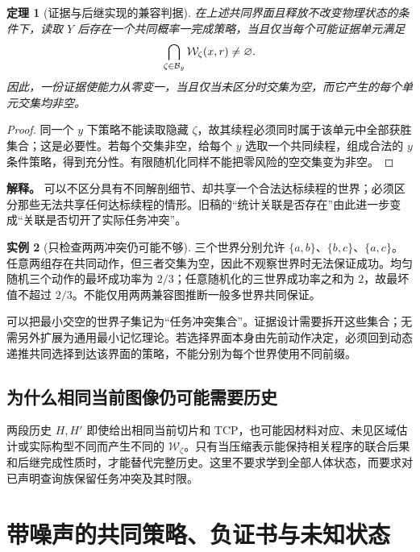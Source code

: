 \documentclass[11pt,a4paper,fontset=fandol]{ctexart}
\newtheorem{theorem}{定理}[section]
\theoremstyle{definition}
\newtheorem{example}[theorem]{实例}
\theoremstyle{remark}\newtheorem{remark}[theorem]{说明}
\numberwithin{equation}{section}
\begin{document}
\begin{theorem}[证据与后继实现的兼容判据]
\label{thm:partition}
在上述共同界面且释放不改变物理状态的条件下，读取 $Y$ 后存在一个共同概率一完成策略，当且仅当每个可能证据单元满足
\begin{equation}
 \bigcap_{\zeta\in\mathcal B_y}\mathcal W_\zeta(x,r)\ne\varnothing.
 \label{eq:intersection}
\end{equation}
因此，一份证据使能力从零变一，当且仅当未区分时交集为空，而它产生的每个单元交集均非空。
\end{theorem}
\begin{proof}
同一个 $y$ 下策略不能读取隐藏 $\zeta$，故其续程必须同时属于该单元中全部获胜集合；这是必要性。若每个交集非空，给每个 $y$ 选取一个共同续程，组成合法的 $y$ 条件策略，得到充分性。有限随机化同样不能把零风险的空交集变为非空。
\end{proof}

\textbf{解释。} 可以不区分具有不同解剖细节、却共享一个合法达标续程的世界；必须区分那些无法共享任何达标续程的情形。旧稿的“统计关联是否存在”由此进一步变成“关联是否切开了实际任务冲突”。

\begin{example}[只检查两两冲突仍可能不够]
三个世界分别允许 $\{a,b\}$、$\{b,c\}$、$\{a,c\}$。任意两组存在共同动作，但三者交集为空，因此不观察世界时无法保证成功。均匀随机三个动作的最坏成功率为 $2/3$；任意随机化的三世界成功率之和为 $2$，故最坏值不超过 $2/3$。不能仅用两两兼容图推断一般多世界共同保证。
\end{example}
可以把最小交空的世界子集记为“任务冲突集合”。证据设计需要拆开这些集合；无需另外扩展为通用最小记忆理论。若选择界面本身由先前动作决定，必须回到动态递推共同选择到达该界面的策略，不能分别为每个世界使用不同前缀。

\subsection{为什么相同当前图像仍可能需要历史}
两段历史 $H,H'$ 即使给出相同当前切片和 TCP，也可能因材料对应、未见区域估计或实际构型不同而产生不同的 $\mathcal W_\zeta$。只有当压缩表示能保持相关程序的联合后果和后继完成性质时，才能替代完整历史。这里不要求学到全部人体状态，而要求对已声明查询族保留任务冲突及其时限。

\section{带噪声的共同策略、负证书与未知状态}
\label{sec:lp}
\end{document}

